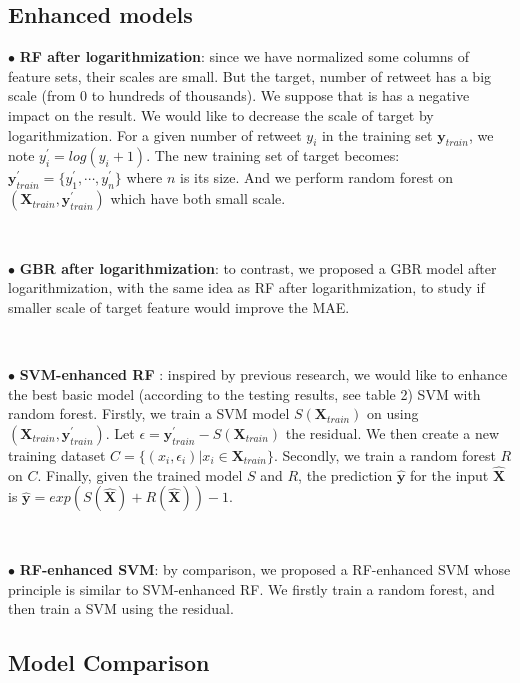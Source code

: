 \subsection*{Enhanced models}

$\bullet$ \textbf{RF after logarithmization}\label{model:rf}: since we have normalized some columns of feature sets, their scales are small. But the target, number of retweet has a big scale (from 0 to hundreds of thousands). We suppose that is has a negative impact on the result. We would like to decrease the scale of target by logarithmization. For a given number of retweet $y_i$ in the training set $\textbf{y}_{train}$, we note $y_i^{'} = log(y_i+1)$. The new training set of target becomes: $\textbf{y}_{train}^{'} = \{ y_1^{'}, \cdots, y_n^{'} \}$ where $n$ is its size. And we perform random forest on $(\textbf{X}_{train},\textbf{y}_{train}^{'})$ which have both small scale.

\

$\bullet$ \textbf{GBR after logarithmization}: to contrast, we proposed a GBR model after logarithmization, with the same idea as RF after logarithmization, to study if smaller scale of target feature would improve the MAE.

\

$\bullet$ \textbf{SVM-enhanced RF} : inspired by previous research\cite{Piao}, we would like to enhance the best basic model (according to the testing results, see table 2) SVM with random forest. Firstly, we train a SVM model $S(\textbf{X}_{train})$ on using $(\textbf{X}_{train},\textbf{y}_{train}^{'})$. Let $\epsilon = \textbf{y}_{train}^{'} - S(\textbf{X}_{train})$ the residual. We then create a new training dataset $C=\{(x_i,\epsilon_i)|x_i \in \textbf{X}_{train}\}$. Secondly, we train a random forest $R$ on $C$. Finally, given the trained model $S$ and $R$, the prediction $\hat{\textbf{y}}$ for the input $\hat{\textbf{X}}$ is $\hat{\textbf{y}} = exp(S(\hat{\textbf{X}})+R(\hat{\textbf{X}}))-1$.

\

$\bullet$ \textbf{RF-enhanced SVM}: by comparison, we proposed a RF-enhanced SVM whose principle is similar to SVM-enhanced RF. We firstly train a random forest, and then train a SVM using the residual.





\subsection*{Model Comparison}

